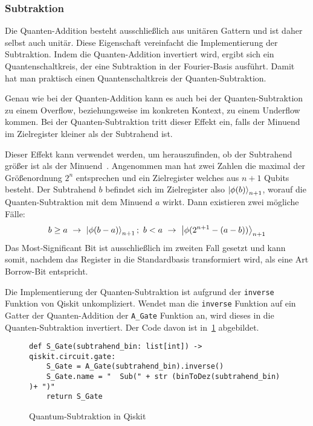 \subsubsection{Subtraktion}
Die Quanten-Addition besteht ausschließlich aus unitären Gattern 
und ist daher selbst auch unitär. 
Diese Eigenschaft vereinfacht die Implementierung der Subtraktion. 
Indem die Quanten-Addition invertiert wird, ergibt sich ein Quantenschaltkreis, 
der eine Subtraktion in der Fourier-Basis ausführt. 
Damit hat man praktisch einen Quantenschaltkreis der Quanten-Subtraktion.

Genau wie bei der Quanten-Addition kann es auch bei der Quanten-Subtraktion zu einem Overflow,
beziehungsweise im konkreten Kontext, zu einem Underflow kommen.
Bei der Quanten-Subtraktion tritt dieser Effekt ein, 
falls der Minuend im Zielregister kleiner als der Subtrahend ist.

Dieser Effekt kann verwendet werden, um herauszufinden, 
ob der Subtrahend größer ist als der Minuend~\cite{beauregard2003circuit}.
Angenommen man hat zwei Zahlen die maximal der Größenordnung \(2^n\) entsprechen und 
ein Zielregister welches aus \(n+1\) Qubits besteht.
Der Subtrahend \(b\) befindet sich im Zielregister also \(\ket{\phi(b)}_{n+1}\), 
worauf die Quanten-Subtraktion mit dem Minuend \(a\) wirkt.
Dann existieren zwei mögliche Fälle:
\[b \geq a~\rightarrow~\ket{\phi(b-a)}_{n+1};~
b < a~\rightarrow~\ket{\phi(2^{n+1}-(a-b))}_{n+1}
  \]
Das Most-Significant Bit ist ausschließlich im zweiten Fall gesetzt und kann somit, 
nachdem das Register in die Standardbasis transformiert wird, 
als eine Art Borrow-Bit entspricht.

Die Implementierung der Quanten-Subtraktion ist aufgrund der \texttt{inverse} Funktion von Qiskit unkompliziert.
Wendet man die \texttt{inverse} Funktion auf ein Gatter der Quanten-Addition der \texttt{A\_Gate} Funktion an, 
wird dieses in die Quanten-Subtraktion invertiert.
Der Code davon ist in~\ref{code:QuantumSub} abgebildet.
\begin{figure}[H]
  \caption{Quantum-Subtraktion in Qiskit}
  \label{code:QuantumSub}
\begin{verbatim}    
def S_Gate(subtrahend_bin: list[int]) -> qiskit.circuit.gate:
    S_Gate = A_Gate(subtrahend_bin).inverse()
    S_Gate.name = "  Sub(" + str (binToDez(subtrahend_bin) )+ ")"
    return S_Gate
  \end{verbatim}
\end{figure}

